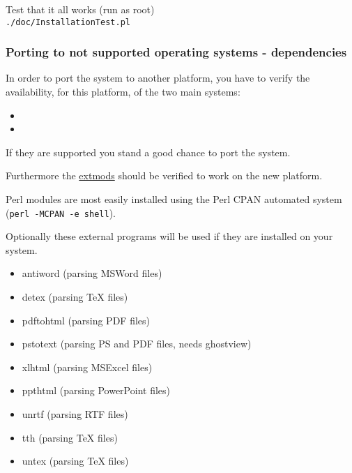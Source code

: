 Test that it all works (run as root)\\
{\tt ./doc/InstallationTest.pl}

\subsubsection{Porting to not supported operating systems - dependencies}
In order to port the system to another platform, you
have to verify the availability, for this platform, of the two main systems:
\begin{itemize}
\item {}
\item {}
\end{itemize}
If they are supported you stand a good chance to port the system.

 Furthermore
the \hyperref{external Perl modules}{external Perl modules (listed in }{)}{extmods} should be verified to work
on the new platform.


Perl modules are most easily installed 
using the Perl CPAN automated system\\
({\tt perl -MCPAN -e shell}).

Optionally these external programs will be used if they are 
installed on your system.
\begin{itemize}
 \item antiword (parsing MSWord files)
 \item detex (parsing TeX files)
 \item pdftohtml (parsing PDF files)
 \item pstotext (parsing PS and PDF files, needs ghostview)
 \item xlhtml (parsing MSExcel files)
 \item ppthtml (parsing PowerPoint files)
 \item unrtf (parsing RTF files)
 \item tth (parsing TeX files)
 \item untex (parsing TeX files)
\end{itemize}

